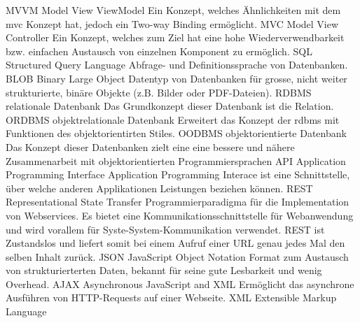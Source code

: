   {MVVM}               %
  {Model View ViewModel}  %
  {Ein Konzept, welches Ähnlichkeiten mit dem \gls{mvc} Konzept hat, jedoch ein Two-way Binding ermöglicht.}
  {MVC}               %
  {Model View Controller}  %
  {Ein Konzept, welches zum Ziel hat eine hohe Wiederverwendbarkeit bzw. einfachen Austausch von einzelnen Komponent zu ermöglich.}  
  {SQL}               %
  {Structured Query Language}  %
  {Abfrage- und Definitionssprache von Datenbanken.}
  {BLOB}               %
  {Binary Large Object}  %
  {Datentyp von Datenbanken für grosse, nicht weiter strukturierte, binäre Objekte (z.B. Bilder oder PDF-Dateien).}
  {RDBMS}               %
  {relationale Datenbank}  %
  {Das Grundkonzept dieser Datenbank ist die Relation.}
  {ORDBMS}               %
  {objektrelationale Datenbank}  %
  {Erweitert das Konzept der \gls{rdbms} mit Funktionen des objektorientirten Stiles.}
  {OODBMS}               %
  {objektorientierte Datenbank}  %
  {Das Konzept dieser Datenbanken zielt eine eine bessere und nähere Zusammenarbeit mit objektorientierten Programmiersprachen}
  {API}               %
  {Application Programming Interface}
  {Application Programming Interace ist eine Schnittstelle, über welche anderen Applikationen Leistungen beziehen können.}
  {REST}               %
  {Representational State Transfer}
  {Programmierparadigma für die Implementation von Webservices. Es bietet eine Kommunikationsschnittstelle für Webanwendung und 
wird vorallem für Syste-System-Kommunikation verwendet. REST ist Zustandslos und liefert somit bei einem Aufruf einer URL genau 
jedes Mal den selben Inhalt zurück.}
  {JSON}               %
  {JavaScript Object Notation}  %
  {Format zum Austausch von strukturierterten Daten, bekannt für seine gute Lesbarkeit und wenig Overhead.}
  {AJAX}               %
  {Asynchronous JavaScript and XML}  %
  {Ermöglicht das asynchrone Ausführen von HTTP-Requests auf einer Webseite.}
  {XML}               %
  {Extensible Markup Language}  %
